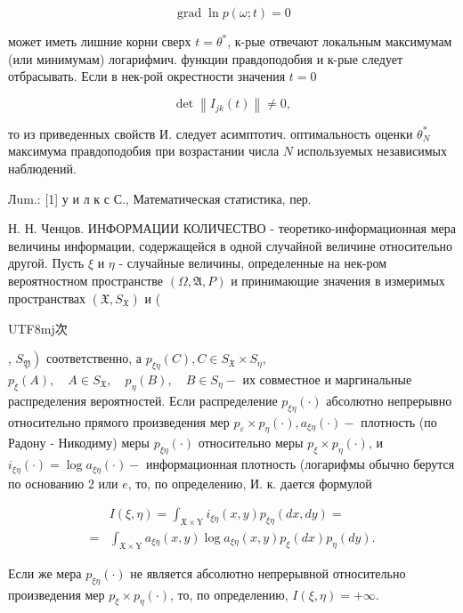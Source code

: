 \documentclass[10pt]{article}
\begin{document}
\[

\operatorname{grad} \ln p(\omega ; t)=0

\]



может иметь лишние корни сверх $t=\theta^{*}$, к-рые отвечают локальным максимумам (или минимумам) логарифмич. функции правдоподобия и к-рые следует отбрасывать. Если в нек-рой окрестности значения $t=0$



\[

\operatorname{det}\left\|I_{j k}(t)\right\| \neq 0,

\]



то из приведенных свойств И. следует асимптотич. оптимальность оценки $\theta_{N}^{*}$ максимума правдоподобия при возрастании числа $N$ используемых независимых наблюдений.



Лum.: [1] у и л к с С., Математическая статистика, пер.

Н. Н. Ченцов. ИНФОРМАЦИИ КОЛИЧЕСТВО - теоретико-информационная мера величины информации, содержащейся в одной случайной величине относительно другой. Пусть $\xi$ и $\eta$ - случайные величины, определенные на нек-ром вероятностном пространстве $(\Omega, \mathfrak{A}, P)$ и принимающие значения в измеримых пространствах $\left(\mathfrak{X}, S_{\mathfrak{X}}\right)$ и (\begin{CJK}{UTF8}{mj}次\end{CJK}, $\left.S_{\mathfrak{Y}}\right)$ соответственно, а $p_{\xi \eta}(C), C \in S_{\mathfrak{X}} \times S_{\mathfrak{\eta}}$, $p_{\xi}(A), \quad A \in S_{\mathfrak{X}}, \quad p_{\eta}(B), \quad B \in S_{\mathfrak{\eta}}-$ их совместное и маргинальные распределения вероятностей. Если распределение $p_{\xi \eta}(\cdot)$ абсолютно непрерывно относительно прямого произведения мер $p_{\varepsilon} \times p_{\eta}(\cdot), a_{\xi \eta}(\cdot)-$ плотность (по Радону - Никодиму) меры $p_{\xi \eta}(\cdot)$ относительно меры $p_{\xi} \times p_{\eta}(\cdot)$, и $i_{\xi \eta}(\cdot)=\log a_{\xi \eta}(\cdot)-$ информационная плотность (логарифмы обычно берутся по основанию 2 или $e$, то, по определению, И. к. дается формулой



\[

\begin{aligned}

& I(\xi, \eta)=\int_{\mathfrak{X} \times \mathrm{Y}} i_{\xi \eta}(x, y) p_{\xi \eta}(d x, d y)= \\

= & \int_{\mathfrak{X} \times \mathrm{Y}} a_{\xi \eta}(x, y) \log a_{\xi \eta}(x, y) p_{\xi}(d x) p_{\eta}(d y) .

\end{aligned}

\]



Если же мера $p_{\xi \eta}(\cdot)$ не является абсолютно непрерывной относительно произведения мер $p_{\xi} \times p_{\eta}(\cdot)$, то, по определению, $I(\xi, \eta)=+\infty$.
\end{document}
